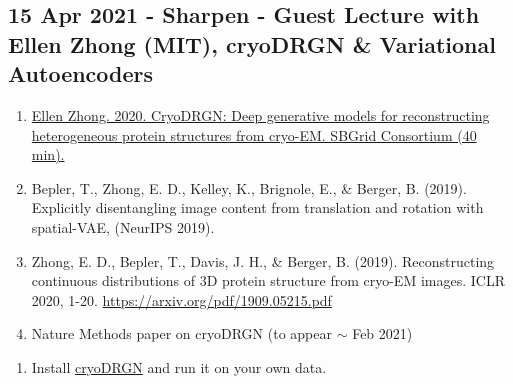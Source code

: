 \documentclass[11pt, oneside]{article}   	%
\begin{document}
\subsection{15 Apr 2021 - Sharpen - Guest Lecture with Ellen Zhong (MIT), cryoDRGN \& Variational Autoencoders}
\begin{enumerate}
	\item \href{https://youtu.be/yft_qhErStg}{Ellen Zhong. 2020. CryoDRGN: Deep generative models for reconstructing heterogeneous protein structures from cryo-EM. SBGrid Consortium (40 min).}
	\item Bepler, T., Zhong, E. D., Kelley, K., Brignole, E., \& Berger, B. (2019). Explicitly disentangling image content from translation and rotation with spatial-VAE, (NeurIPS 2019).
	\item Zhong, E. D., Bepler, T., Davis, J. H., \& Berger, B. (2019). Reconstructing continuous distributions of 3D protein structure from cryo-EM images. ICLR 2020, 1-20. \url{https://arxiv.org/pdf/1909.05215.pdf}
	\item Nature Methods paper on cryoDRGN (to appear $\sim$ Feb 2021)
\end{enumerate}
\begin{enumerate}
	\item Install \href{https://github.com/zhonge/cryodrgn}{cryoDRGN} and run it on your own data.
\end{enumerate}
\end{document}
